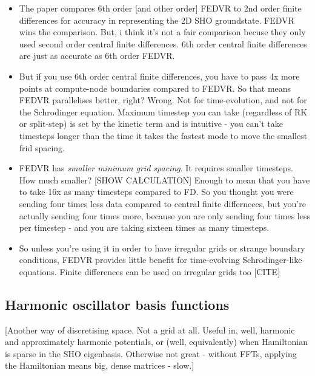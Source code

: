 \begin{itemize}
    \item The paper compares 6th order [and other order] FEDVR to 2nd order finite differences for accuracy in representing the 2D SHO groundstate. FEDVR wins the comparison. But, i think it's not a fair comparison becuse they only used second order central finite differences. 6th order central finite differences are just as accurate as 6th order FEDVR.
    \item But if you use 6th order central finite differences, you have to pass 4x more points at compute-node boundaries compared to FEDVR. So that means FEDVR parallelises better, right? Wrong. Not for time-evolution, and not for the Schrodinger equation. Maximum timestep you can take (regardless of RK or split-step) is set by the kinetic term and is intuitive - you can't take timesteps longer than the time it takes the fastest mode to move the smallest frid spacing.
    \item FEDVR has \emph{smaller minimum grid spacing}. It requires smaller timesteps. How much smaller? [SHOW CALCULATION] Enough to mean that you have to take 16x as many timesteps compared to FD. So you thought you were sending four times less data compared to central finite differneces, but you're actually sending four times more, because you are only sending four times less per timestep - and you are taking sixteen times as many timesteps.

    \item So unless you're using it in order to have irregular grids or strange boundary conditions, FEDVR provides little benefit for time-evolving Schrodinger-like equations. Finite differences can be used on irregular grids too [CITE]

\end{itemize}

\subsection{Harmonic oscillator basis functions}

[Another way of discretising space. Not a grid at all. Useful in, well, harmonic and approximately harmonic potentials, or (well, equivalently) when Hamiltonian is sparse in the SHO eigenbasis. Otherwise not great - without FFTs, applying the Hamiltonian means big, dense matrices - slow.]



